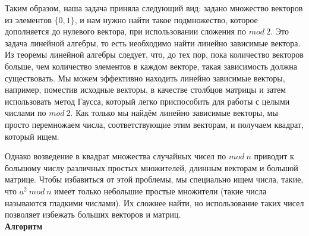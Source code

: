 \documentclass[12pt,a4paper]{scrartcl}
\begin{document}
Таким образом, наша задача приняла следующий вид: задано множество векторов из элементов $\{0,1\}$, и нам нужно найти такое подмножество, которое дополняется до нулевого вектора, при использовании сложения по $mod\ 2$. Это задача линейной алгебры, то есть необходимо найти линейно зависимые вектора. Из теоремы линейной алгебры следует, что, до тех пор, пока количество векторов больше, чем количество элементов в каждом векторе, такая зависимость должна существовать. Мы можем эффективно находить линейно зависимые векторы, например, поместив исходные векторы, в качестве столбцов матрицы и затем использовать метод Гаусса, который легко приспособить для работы с целыми числами по $mod\ 2$. Как только мы найдём линейно зависимые векторы, мы просто перемножаем числа, соответствующие этим векторам, и получаем квадрат, который ищем.

Однако возведение в квадрат множества случайных чисел по $mod\ n$ приводит к большому числу различных простых множителей, длинным векторам и большой матрице. Чтобы избавиться от этой проблемы, мы специально ищем числа, такие, что $a^2\ mod\ n$ имеет только небольшие простые множители (такие числа называются гладкими числами). Их сложнее найти, но использование таких чисел позволяет избежать больших векторов и матриц.\\

\textbf{Алгоритм}
\end{document}
